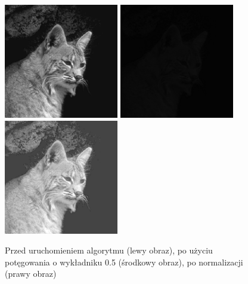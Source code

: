 \documentclass[a4paper,12pt]{book}
\begin{document}
\begin{figure}[H]
\caption{Przed uruchomieniem algorytmu (lewy obraz), po użyciu potęgowania o wykładniku 0.5 (środkowy obraz), po normalizacji (prawy obraz)}
\includegraphics[width=5cm, height=5cm]{cat-unmodified.jpg}
\includegraphics[width=5cm, height=5cm]{2-4/power-gray-cat-5.png}
\includegraphics[width=5cm, height=5cm]{2-4/power-gray-cat-5-norm.png}
\end{figure}
\end{document}
